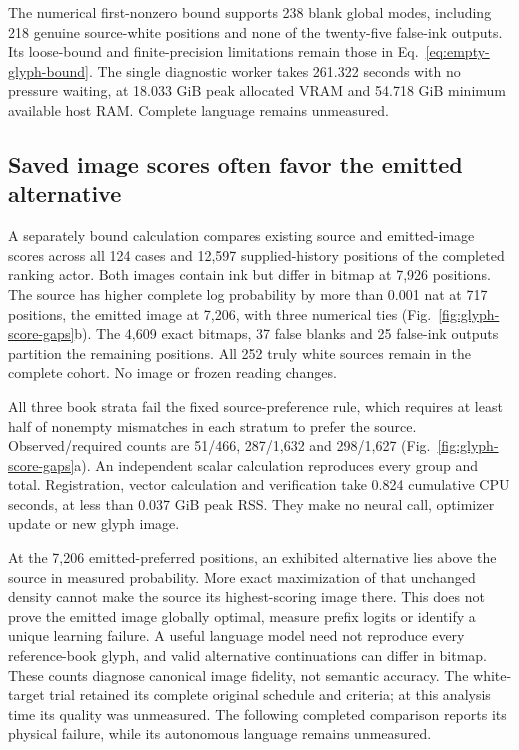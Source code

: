 \documentclass[12pt,a4paper]{article}
\providecommand{\DIFadd}[1]{{\protect\color{blue} \sf #1}} %
\begin{document}
\DIFadd{The numerical first-nonzero bound supports 238 blank global modes, including
218 genuine source-white positions and none of the twenty-five false-ink
outputs. Its loose-bound and finite-precision limitations remain those in
Eq.~\ref{eq:empty-glyph-bound}. The single diagnostic worker takes 261.322
seconds with no pressure waiting, at 18.033 GiB peak allocated VRAM and
54.718 GiB minimum available host RAM. Complete language remains unmeasured.
}

\subsection*{\DIFadd{Saved image scores often favor the emitted alternative}}

\DIFadd{A separately bound calculation compares existing source and emitted-image
scores across all 124 cases and 12,597 supplied-history positions of the
completed ranking actor. Both images contain ink but differ in bitmap at
7,926 positions. The source has higher complete log probability by more than
0.001 nat at 717 positions, the emitted image at 7,206, with three numerical
ties (Fig.~\ref{fig:glyph-score-gaps}b). The 4,609 exact bitmaps, 37 false blanks
and 25 false-ink outputs partition the remaining positions. All 252 truly white
sources remain in the complete cohort. No image or frozen reading changes.
}

\DIFadd{All three book strata fail the fixed source-preference rule, which requires
at least half of nonempty mismatches in each stratum to prefer the source.
Observed/required counts are 51/466, 287/1,632 and 298/1,627
(Fig.~\ref{fig:glyph-score-gaps}a). An independent scalar calculation reproduces
every group and total. Registration, vector calculation and verification take
0.824 cumulative CPU seconds, at less than 0.037 GiB peak RSS. They make no
neural call, optimizer update or new glyph image.
}

\DIFadd{At the 7,206 emitted-preferred positions, an exhibited alternative lies above
the source in measured probability. More exact maximization of that unchanged
density cannot make the source its highest-scoring image there. This does not
prove the emitted image globally optimal, measure prefix logits or identify a
unique learning failure. A useful language model need not reproduce every
reference-book glyph, and valid alternative continuations can differ in bitmap.
These counts diagnose canonical image fidelity, not semantic accuracy. The
white-target trial retained its complete original schedule and criteria; at this
analysis time its quality was unmeasured. The following completed comparison
reports its physical failure, while its autonomous language remains unmeasured.
}
\end{document}
